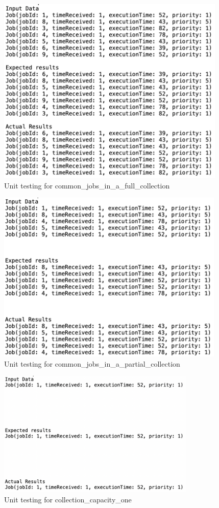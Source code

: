 \documentclass[a4paper]{article}
\begin{document}
\begin{figure}[H]
   \includegraphics[height=9cm]{images/SJF-common_jobs_in_a_full_collection.png}
   \caption{Unit testing for common\_jobs\_in\_a\_full\_collection}
\end{figure}

\begin{figure}[H]
   \includegraphics[height=8.2cm]{images/SJF-common_jobs_in_a_partial_collection.png}
   \caption{Unit testing for common\_jobs\_in\_a\_partial\_collection}
\end{figure}

\begin{figure}[H]
   \includegraphics[height=6cm]{images/SJF-collection_capacity_one.png}
   \caption{Unit testing for collection\_capacity\_one}
\end{figure}
\end{document}
